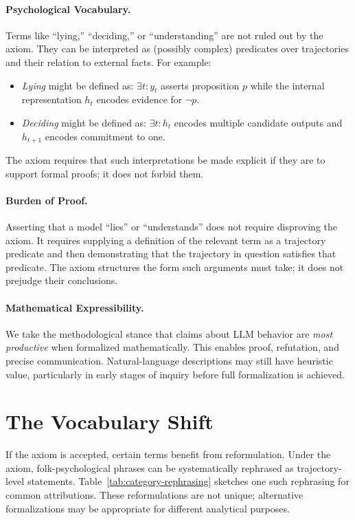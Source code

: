\documentclass[11pt,a4paper]{article}
\begin{document}
\paragraph{Psychological Vocabulary.}
Terms like ``lying,'' ``deciding,'' or ``understanding'' are not ruled out by the axiom. They can be interpreted as (possibly complex) predicates over trajectories and their relation to external facts. For example:
\begin{itemize}
    \item \emph{Lying} might be defined as: $\exists t: y_t$ asserts proposition $p$ while the internal representation $h_t$ encodes evidence for $\neg p$.
    \item \emph{Deciding} might be defined as: $\exists t: h_t$ encodes multiple candidate outputs and $h_{t+1}$ encodes commitment to one.
\end{itemize}
The axiom requires that such interpretations be made explicit if they are to support formal proofs; it does not forbid them.

\paragraph{Burden of Proof.}
Asserting that a model ``lies'' or ``understands'' does not require disproving the axiom. It requires supplying a definition of the relevant term as a trajectory predicate and then demonstrating that the trajectory in question satisfies that predicate. The axiom structures the form such arguments must take; it does not prejudge their conclusions.

\paragraph{Mathematical Expressibility.}
We take the methodological stance that claims about LLM behavior are \emph{most productive} when formalized mathematically. This enables proof, refutation, and precise communication. Natural-language descriptions may still have heuristic value, particularly in early stages of inquiry before full formalization is achieved.

\section{The Vocabulary Shift}

If the axiom is accepted, certain terms benefit from reformulation. Under the axiom, folk-psychological phrases can be systematically rephrased as trajectory-level statements. Table~\ref{tab:category-rephrasing} sketches one such rephrasing for common attributions. These reformulations are not unique; alternative formalizations may be appropriate for different analytical purposes.
\end{document}
